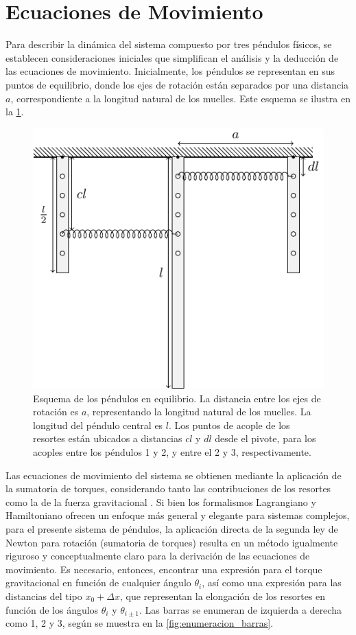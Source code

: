 \section{Ecuaciones de Movimiento}

Para describir la din\'amica del sistema compuesto por tres p\'endulos
f\'isicos, se establecen consideraciones iniciales que simplifican el
an\'alisis y la deducci\'on de las ecuaciones de movimiento.
Inicialmente, los p\'endulos se representan en sus puntos de
equilibrio, donde los ejes de rotaci\'on est\'an separados por una
distancia $a$, correspondiente a la longitud natural de los muelles.
Este esquema se ilustra en la \cref{fig:esquema_equilibrio}.

\begin{figure}[htbp!]
  \centering
  \includegraphics[width=0.8\linewidth]{./Figures/system-diagram.pdf}
  \caption{Esquema de los p\'endulos en equilibrio. La distancia
    entre los ejes de rotaci\'on es $a$, representando la longitud
    natural de los muelles. La longitud del p\'endulo central es $l$.
    Los puntos de acople de los resortes est\'an ubicados a distancias
    $cl$ y $dl$ desde el pivote, para los acoples entre los
    p\'endulos 1 y 2, y entre el 2 y 3, respectivamente.
  }
  \label{fig:esquema_equilibrio}
\end{figure}

Las ecuaciones de movimiento del sistema se obtienen mediante la
aplicaci\'on de la sumatoria de torques, considerando tanto las
contribuciones de los resortes como la de la fuerza gravitacional
. Si bien los formalismos Lagrangiano y Hamiltoniano
ofrecen un enfoque m\'as general y elegante para sistemas complejos,
para el presente sistema de p\'endulos, la aplicaci\'on directa de
la segunda ley de Newton para rotaci\'on (sumatoria de torques)
resulta en un m\'etodo igualmente riguroso y conceptualmente claro
para la derivaci\'on de las ecuaciones de movimiento.
Es necesario, entonces, encontrar una expresi\'on para el torque
gravitacional en funci\'on de cualquier \'angulo $\theta_i$, as\'i
como una expresi\'on para las distancias del tipo $x_0 + \Delta x$,
que representan la elongaci\'on de los resortes en funci\'on de los
\'angulos $\theta_i$ y $\theta_{i\pm 1}$. Las barras se
enumeran de izquierda a derecha como 1, 2 y 3, seg\'un se muestra en la
\cref{fig:enumeracion_barras}.


